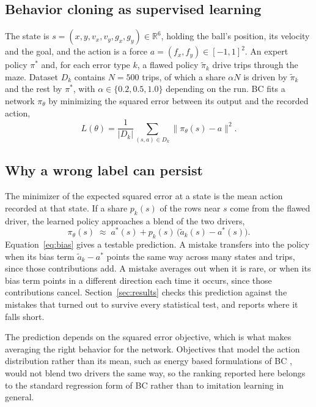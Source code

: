 \documentclass[conference]{IEEEtran}
\begin{document}
\subsection{Behavior cloning as supervised learning}
The state is $s=(x,y,v_x,v_y,g_x,g_y)\in\mathbb{R}^6$, holding the ball's position, its velocity and the goal,
and the action is a force $a=(f_x,f_y)\in[-1,1]^2$. An expert policy $\pi^*$ and, for each error type $k$, a
flawed policy $\tilde\pi_k$ drive trips through the maze. Dataset $D_k$ contains $N=500$ trips, of which a share
$\alpha N$ is driven by $\tilde\pi_k$ and the rest by $\pi^*$, with $\alpha\in\{0.2,0.5,1.0\}$ depending on the
run. BC fits a network $\pi_\theta$ by minimizing the squared error between its output and the recorded action,
\begin{equation}
  L(\theta)=\frac{1}{|D_k|}\sum_{(s,a)\in D_k}\big\|\pi_\theta(s)-a\big\|^2 .
  \label{eq:loss}
\end{equation}

\subsection{Why a wrong label can persist}
The minimizer of the expected squared error at a state is the mean action recorded at that state. If a share
$p_k(s)$ of the rows near $s$ come from the flawed driver, the learned policy approaches a blend of the two
drivers,
\begin{equation}
  \pi_\theta(s)\;\approx\;a^*(s)+p_k(s)\,\big(\tilde a_k(s)-a^*(s)\big).
  \label{eq:bias}
\end{equation}
Equation~\eqref{eq:bias} gives a testable prediction. A mistake transfers into the policy when its bias term
$\tilde a_k-a^*$ points the same way across many states and trips, since those contributions add. A mistake
averages out when it is rare, or when its bias term points in a different direction each time it occurs, since
those contributions cancel. Section~\ref{sec:results} checks this prediction against the mistakes that turned out
to survive every statistical test, and reports where it falls short.

The prediction depends on the squared error objective, which is what makes averaging the right behavior for the
network. Objectives that model the action distribution rather than its mean, such as energy based formulations of
BC \cite{florence}, would not blend two drivers the same way, so the ranking reported here belongs to the
standard regression form of BC rather than to imitation learning in general.
\end{document}
